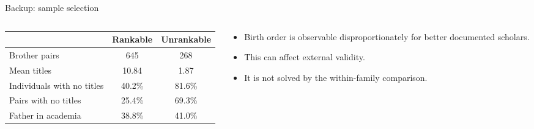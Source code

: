 \documentclass[aspectratio=169,10pt]{beamer}
\begin{document}
\begin{frame}{Backup: sample selection}
\begin{columns}[T,onlytextwidth]
\begin{column}{0.52\textwidth}
\centering
\small
\begin{tabular}{lcc}
\toprule
 & Rankable & Unrankable\\
\midrule
Brother pairs & 645 & 268\\
Mean titles & 10.84 & 1.87\\
Individuals with no titles & 40.2\% & 81.6\%\\
Pairs with no titles & 25.4\% & 69.3\%\\
Father in academia & 38.8\% & 41.0\%\\
\bottomrule
\end{tabular}
\end{column}

\begin{column}{0.44\textwidth}
\begin{itemize}
  \item Birth order is observable disproportionately for better documented scholars.
  \item This can affect external validity.
  \item It is not solved by the within-family comparison.
\end{itemize}
\end{column}
\end{columns}
\end{frame}
\end{document}
